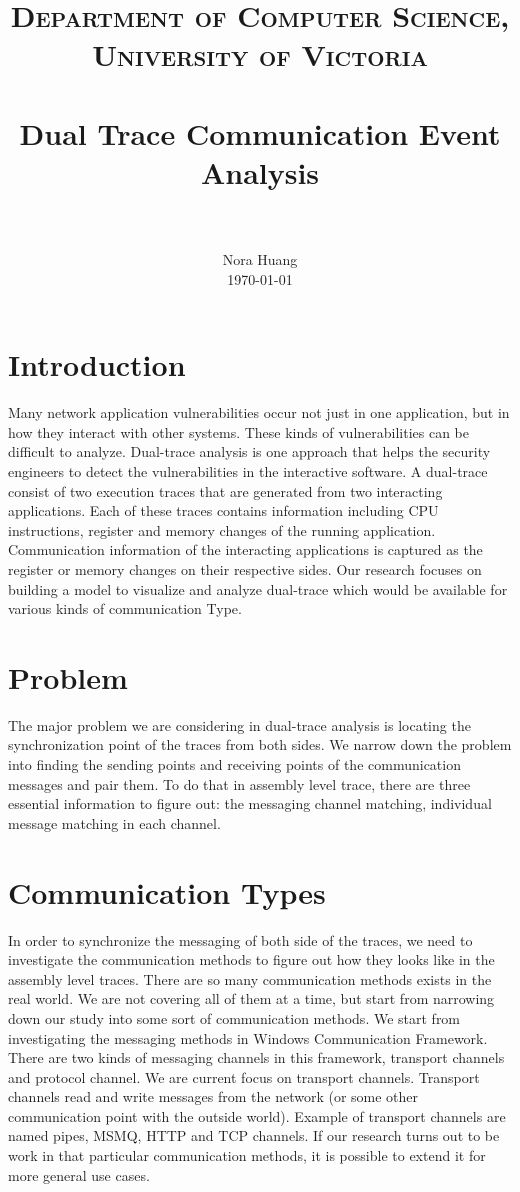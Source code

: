 \documentclass[paper=a4, fontsize=11pt]{scrartcl}
\title{
		\usefont{OT1}{bch}{b}{n}
		\normalfont \normalsize \textsc{Department of Computer Science,  University of Victoria} \\ [25pt]
		\horrule{0.5pt} \\[0.4cm]
		\huge Dual Trace Communication Event Analysis  \\
		\horrule{2pt} \\[0.5cm]
}
\author{
		\normalfont 								\normalsize
        Nora Huang\\[-3pt]		\normalsize
        \today
}
\date{}
\numberwithin{equation}{section}		%
\numberwithin{figure}{section}			%
\numberwithin{table}{section}				%
\begin{document}
\maketitle

\section{Introduction}
Many network application vulnerabilities occur not just in one application, but in how they interact with other systems. These kinds of vulnerabilities can be difficult to analyze. Dual-trace analysis is one approach that helps the security engineers to detect the vulnerabilities in the interactive software. A dual-trace consist of two execution traces that are generated from two interacting applications. Each of these traces contains information including CPU instructions, register and memory changes of the running application. Communication information of the interacting applications is captured as the register or memory changes on their respective sides. Our research focuses on building a model to visualize and analyze dual-trace which would be available for various kinds of communication Type.

\section{Problem}
The major problem we are considering in dual-trace analysis is locating the synchronization point of the traces from both sides. We narrow down the problem into finding the sending points and receiving points of the communication messages and pair them. To do that in assembly level trace, there are three essential information to figure out: the messaging channel matching, individual message matching in each channel.

\section{Communication Types}
In order to synchronize the messaging of both side of the traces, we need to investigate the communication methods to figure out how they looks like in the assembly level traces.
There are so many communication methods exists in the real world. We are not covering all of them at a time, but start from narrowing down our study into some sort of communication methods. We start from investigating the messaging methods in Windows Communication Framework. There are two kinds of messaging channels in this framework, transport channels and protocol channel. We are current focus on transport channels. Transport channels read and write messages from the network (or some other communication point with the outside world). Example of transport channels are named pipes, MSMQ, HTTP and TCP channels. If our research turns out to be work in that particular communication methods, it is possible to extend it for more general use cases.
\end{document}
